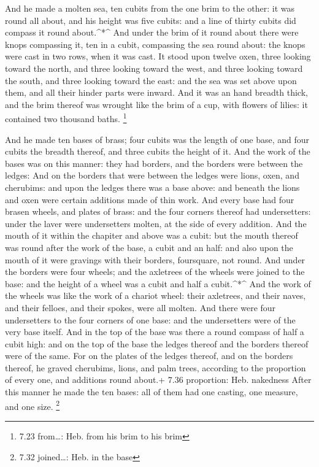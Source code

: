 And he made a molten sea, ten cubits from the one brim to
the other: it was round all about, and his height was five cubits: and a
line of thirty cubits did compass it round about.\^{}*\^{} 
And under the brim of it round about there were knops compassing it, ten
in a cubit, compassing the sea round about: the knops were cast in two
rows, when it was cast.  It stood upon twelve oxen, three
looking toward the north, and three looking toward the west, and three
looking toward the south, and three looking toward the east: and the sea
was set above upon them, and all their hinder parts were inward.
 And it was an hand breadth thick, and the brim thereof was
wrought like the brim of a cup, with flowers of lilies: it contained two
thousand baths. \footnote{7.23 from\ldots: Heb. from his brim to his
  brim}

 And he made ten bases of brass; four cubits was the length
of one base, and four cubits the breadth thereof, and three cubits the
height of it.  And the work of the bases was on this
manner: they had borders, and the borders were between the ledges:
 And on the borders that were between the ledges were
lions, oxen, and cherubims: and upon the ledges there was a base above:
and beneath the lions and oxen were certain additions made of thin work.
 And every base had four brasen wheels, and plates of
brass: and the four corners thereof had undersetters: under the laver
were undersetters molten, at the side of every addition. 
And the mouth of it within the chapiter and above was a cubit: but the
mouth thereof was round after the work of the base, a cubit and an half:
and also upon the mouth of it were gravings with their borders,
foursquare, not round.  And under the borders were four
wheels; and the axletrees of the wheels were joined to the base: and the
height of a wheel was a cubit and half a cubit.\^{}*\^{} 
And the work of the wheels was like the work of a chariot wheel: their
axletrees, and their naves, and their felloes, and their spokes, were
all molten.  And there were four undersetters to the four
corners of one base: and the undersetters were of the very base itself.
 And in the top of the base was there a round compass of
half a cubit high: and on the top of the base the ledges thereof and the
borders thereof were of the same.  For on the plates of the
ledges thereof, and on the borders thereof, he graved cherubims, lions,
and palm trees, according to the proportion of every one, and additions
round about.+ 7.36 proportion: Heb. nakedness  After this
manner he made the ten bases: all of them had one casting, one measure,
and one size. \footnote{7.32 joined\ldots: Heb. in the base}

